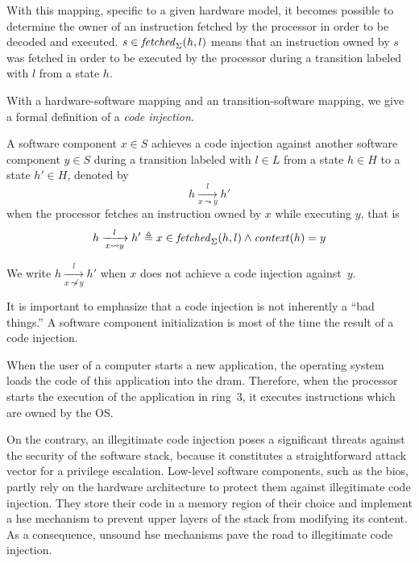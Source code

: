 With this mapping, specific to a given hardware model, it becomes possible to
determine the owner of an instruction fetched by the processor in order to be
decoded and executed.
%
\( s \in \mathit{fetched}_{\Sigma}(h, l) \) means that an instruction owned by $s$
was fetched in order to be executed by the processor during a transition labeled
with \( l \) from a state \( h \).

With a hardware-software mapping and an transition-software mapping, we give a
formal definition of a \textit{code injection}.

%

\begin{definition}
  \label{def:speccert:tempering}
  A software component $x \in S$ achieves a code injection against another
  software component $y \in S$ during a transition labeled with $l \in L$ from a
  state $h \in H$ to a state $h' \in H$, denoted by
  \[
    h \xrightarrow[x \leadsto y]{l} h'
  \]
  when the processor fetches an instruction owned by $x$ while executing $y$,
  that is
  \[
    h \xrightarrow[x \leadsto y]{l} h' \triangleq x \in
    \mathit{fetched}_{\Sigma}(h, l) \wedge \mathit{context}(h) = y
  \]

  We write $h \xrightarrow[x \not\leadsto y]{l} h'$ when $x$ does not achieve a
  code injection against~$y$.
\end{definition}

It is important to emphasize that a code injection is not inherently a ``bad
things.''
%
A software component initialization is most of the time the result of a code
injection.

\begin{example}
  When the user of a computer starts a new application, the operating system
  loads the code of this application into the \ac{dram}.
  Therefore, when the processor starts the execution of the application in
  ring~3, it executes instructions which are owned by the OS.
\end{example}

On the contrary, an illegitimate code injection poses a significant threats
against the security of the software stack, because it constitutes a
straightforward attack vector for a privilege escalation.
%
Low-level software components, such as the \ac{bios}, partly rely on the
hardware architecture to protect them against illegitimate code injection.
%
They store their code in a memory region of their choice and implement a
\ac{hse} mechanism to prevent upper layers of the stack from modifying its
content.
%
As a consequence, unsound \ac{hse} mechanisms pave the road to illegitimate code
injection.

